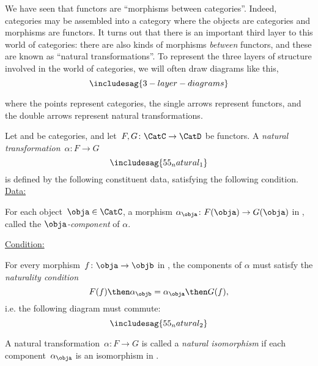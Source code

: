 
We have seen that functors are ``morphisms between categories''. Indeed, categories may be assembled into a category \index{\Category} where the objects are categories and morphisms are functors. It turns out that there is an important third layer to this world of categories: there are also kinds of morphisms \emph{between} functors, and these are known as ``natural transformations''. To represent the three layers of structure involved in the world of categories, we will often draw diagrams like this,
\begin{equation*}
  \includesag{3-layer-diagrams}
\end{equation*}


where the points represent categories, the single arrows represent functors, and the double arrows represent natural transformations.


\begin{ctdefinition}
  Let \CatC and \CatD be categories, and let~$F,G\colon \CatC\to \CatD$ be functors. A \emph{natural transformation}~$\alpha\colon F\to G$
  \begin{equation}
    \includesag{55_natural_1}
  \end{equation}
  is defined by the following constituent data, satisfying the following condition.
  \underline{Data:}
  \begin{compactenum}
    \item For each object~$\obja\in \CatC$, a morphism $\alpha_\obja \colon F(\obja)\to G(\obja)$ in \CatD, called the $\obja$\emph{-component} of $\alpha$.
  \end{compactenum}
  \underline{Condition:}
  \begin{compactenum}
    \item For every morphism~$f\colon \obja\to \objb$ in \CatC, the components of $\alpha$ must satisfy the \emph{naturality condition}
    \begin{equation}
      F(f)\then \alpha_\objb = \alpha_\obja\then G(f),
    \end{equation}
    i.e. the following diagram must commute:
    \begin{equation}
      \includesag{55_natural_2}
    \end{equation}
  \end{compactenum}
\end{ctdefinition}

\begin{ctdefinition}
  \label{def:nat_iso}
  A natural transformation~$\alpha\colon F\to G$ is called a \emph{natural isomorphism} if each component~$\alpha_\obja$ is an isomorphism in \CatD.
\end{ctdefinition}

